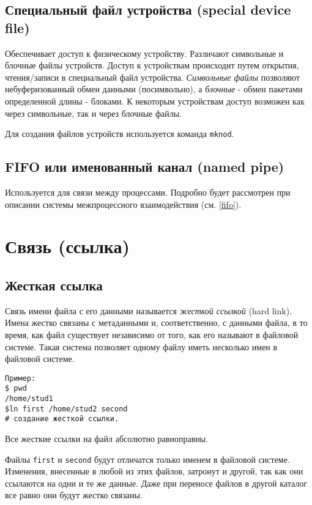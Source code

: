 \subsection{Специальный файл устройства (special device file)}

Обеспечивает доступ к физическому устройству. Различают символьные и блочные файлы устройств. Доступ к устройствам происходит путем открытия, чтения/записи в специальный файл устройства. \emph{Символьные файлы} позволяют небуферизованный обмен данными (посимвольно), а \emph{блочные} - обмен пакетами определенной длины - блоками. К некоторым устройствам доступ возможен как через символьные, так и через блочные файлы.

Для создания файлов устройств используется команда \verb+mknod+.

\subsection{FIFO или именованный канал (named pipe)}

Используется для связи между процессами. Подробно будет рассмотрен при описании системы межпроцессного взаимодействия (см. \ref{fifo}). 

\section {Связь (ссылка)}


\subsection{Жесткая ссылка}

Связь имени файла с его данными называется \emph{жесткой ссылкой} (hard link). 
Имена жестко связаны с метаданными и, соответственно, с данными файла, в то время, как файл существует независимо от того, как его называют в файловой системе. Такая система позволяет одному файлу иметь несколько имен в файловой системе.
\begin{verbatim}
Пример: 
$ pwd
/home/stud1
$ln first /home/stud2 second 
# создание жесткой ссылки.
\end{verbatim}
Все жесткие ссылки на файл абсолютно равноправны.  
 
Файлы \verb+first+ и \verb+second+ будут отличатся только именем в файловой системе. Изменения, внесенные в любой из этих файлов, затронут и другой, так как они ссылаются на одни и те же данные. Даже при переносе файлов в другой каталог все равно они будут жестко связаны.

